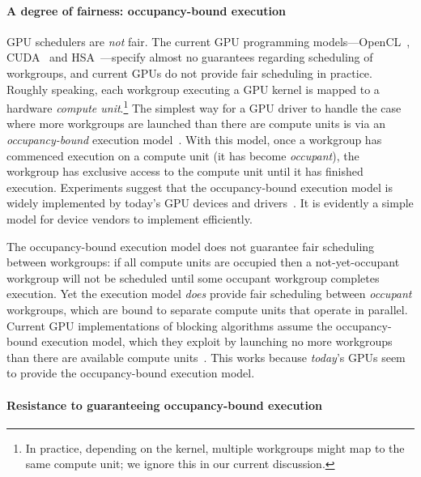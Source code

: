 \documentclass[numbers,nocopyrightspace,10pt]{sigplanconf}
\begin{document}
\paragraph{A degree of fairness: occupancy-bound execution}
GPU schedulers are \emph{not} fair. The current GPU
programming models---OpenCL~\cite{opencl2Spec}, CUDA~\cite{cuda-75}  and
HSA~\cite{HSAprogramming11}---specify almost no guarantees regarding scheduling of
workgroups, and current GPUs do not
provide fair scheduling in practice.  Roughly speaking, each workgroup
executing a GPU kernel is mapped to a hardware \emph{compute
  unit}.\footnote{In practice, depending on the kernel, multiple workgroups might map to the same compute unit; we ignore this in our current discussion.}
%
The simplest way for a GPU driver to handle 
the case where more workgroups are launched than there are compute
units is via an \emph{occupancy-bound}
execution model~\cite{owens-persistent,DBLP:conf/oopsla/SorensenDBGR16}.  With this model, once a workgroup has commenced execution on a
compute unit (it has become \emph{occupant}), the workgroup has
exclusive access to the compute unit until it has finished execution.
Experiments suggest that the occupancy-bound execution model is widely
implemented by today's GPU devices and drivers~\cite{owens-persistent,DBLP:conf/oopsla/SorensenDBGR16,DBLP:conf/oopsla/PaiP16,BNP12}.   It is
evidently a simple model for device vendors to implement efficiently.

The occupancy-bound execution model does not guarantee fair scheduling
between workgroups: if all compute units are occupied then a
not-yet-occupant workgroup will not be scheduled until some occupant
workgroup completes execution.  Yet the execution model \emph{does}
provide fair scheduling between \emph{occupant} workgroups, which are
bound to separate compute units that operate in parallel.  Current GPU
implementations of blocking algorithms assume the
occupancy-bound execution model, which they exploit by launching 
no more workgroups than there are available compute
units~\cite{owens-persistent}. This works because \emph{today}'s GPUs seem to provide the
occupancy-bound execution model.

\paragraph{Resistance to guaranteeing occupancy-bound execution}
\end{document}
